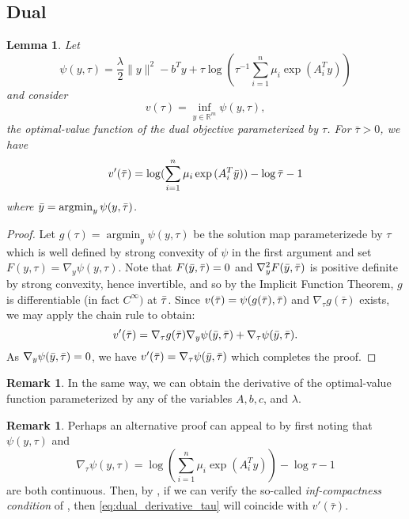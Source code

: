 \documentclass[10pt,a4paper]{article}
\numberwithin{equation}{section}
\newtheorem{lemma}[theorem]{Lemma}
\theoremstyle{definition}
\newtheorem{remark}[theorem]{Remark}
\def\rr{{\mathbb R}}
\DeclareMathOperator{\argmin}{argmin}
\begin{document}
\subsection{Dual}


\begin{lemma}
    Let 
    \[
    \psi(y, \tau) = \frac{\lambda}{2} \lVert y \rVert^2 - b^Ty + \tau \log (\tau^{-1} \sum_{i=1}^n \mu_i \exp{(A_i^Ty)})
    \]
    and consider 
\[
    v(\tau) = \inf_{y \in \rr^m}  \psi(y, \tau),
\]
the optimal-value function of the dual objective parameterized by $\tau$. For $\bar{\tau} > 0$, we have
\[
v'(\Bar{\tau}) =  \log (\sum_{i=1}^n \mu_i \exp{(A_i^T\Bar{y})}) - \log \bar{\tau} - 1
\]
where $\Bar{y} = \argmin_y \psi(y,\bar{\tau})$.
\end{lemma}

\begin{proof}
    Let $g(\tau) =  \argmin_y \psi(y,\tau)$ be the solution map parameterizede by $\tau$ which is well defined by strong convexity of $\psi$ in the first argument and set $F(y, \tau) = \nabla_y \psi(y, \tau)$. Note that $F(\Bar{y}, \Bar{\tau}) = 0$ and $\nabla^2_yF(\Bar{y}, \Bar{\tau})$ is positive definite by strong convexity, hence invertible, and so by the Implicit Function Theorem, $g$ is differentiable (in fact $C^\infty)$ at $\Bar{\tau}$. Since $v(\bar{\tau}) = \psi(g(\bar{\tau}), \Bar{\tau})$ and $\nabla_{\tau} g(\bar{\tau})$ exists, we may apply the chain rule to obtain:
    \[
     v'(\bar{\tau}) = \nabla_\tau g(\bar{\tau}) \nabla_{y} \psi(\bar{y}, \Bar{\tau}) + \nabla_\tau \psi(\Bar{y}, \Bar{\tau}).
    \]
    As $ \nabla_{y} \psi(\bar{y}, \Bar{\tau}) = 0$, we have $v'(\bar{\tau}) = \nabla_\tau \psi(\Bar{y}, \Bar{\tau})$ which completes the proof.
\end{proof}

\begin{remark}
    In the same way, we can obtain the derivative of the optimal-value function parameterized by any of the variables $A, b, c$, and $\lambda$. 
\end{remark}


\begin{remark}
    Perhaps an alternative proof can appeal to \cite{Bonnans2000} by first noting that $\psi(y, \tau)$ and 
\begin{equation}\label{eq:dual_derivative_tau}
\nabla_\tau \psi(y, \tau) = \log (\sum_{i=1}^n \mu_i \exp{(A_i^Ty)}) - \log \tau - 1
\end{equation}
are both continuous. Then, by \cite[Theorem 4.13]{Bonnans2000}, if we can verify the so-called \emph{inf-compactness condition} of \cite[page 272]{Bonnans2000}, then \eqref{eq:dual_derivative_tau} will coincide with $v'(\bar{\tau})$. 
\end{remark}
\end{document}
